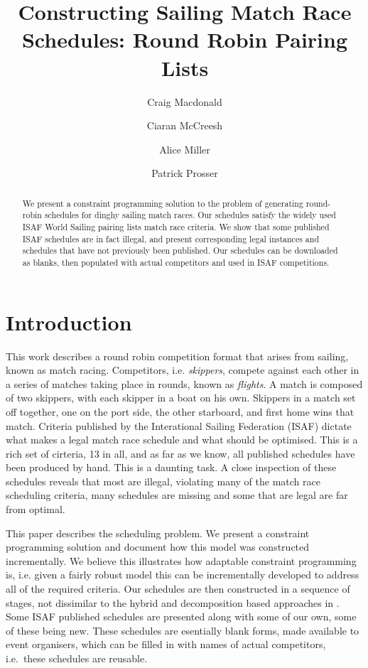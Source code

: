 \documentclass{llncs}
\begin{document}
\title{Constructing Sailing Match Race Schedules: Round Robin Pairing Lists}
\author{Craig Macdonald \and Ciaran McCreesh \and Alice Miller \and Patrick Prosser}
\maketitle

\begin{abstract} 
We present a constraint programming solution to the problem of generating round-robin schedules for dinghy sailing match races. Our schedules satisfy the widely used ISAF World Sailing pairing lists match race criteria. We show that some published ISAF schedules are in fact illegal, and present corresponding legal instances and schedules that have not previously been published. Our schedules can be downloaded as blanks, then populated with actual competitors and used in ISAF competitions. 
\end{abstract}

\section{Introduction}
This work describes a round robin competition format that arises from sailing, known as match racing. Competitors, i.e. {\em skippers}, compete against each other in a series of matches taking place in rounds, known as {\em flights}.  A match is composed of two skippers, with each skipper in a boat on his own. Skippers in a match set off together, one on the port side, the other starboard, and first home wins that match. Criteria published by the Interational Sailing Federation (ISAF) dictate what makes a legal match race schedule and what should be optimised. This is a rich set of cirteria, 13 in all, and as far as we know, all published schedules have been produced by hand. This is a daunting task. A close inspection of these schedules reveals that most are illegal, violating many of the match race scheduling criteria, many schedules are missing and some that are legal are far from optimal.

This paper describes the scheduling problem. We present a constraint programming solution and document how this model was constructed incrementally. We believe this illustrates how adaptable constraint programming is, i.e. given a fairly robust model this can be incrementally developed to address all of the required criteria. Our schedules are then constructed in a sequence of stages, not dissimilar to the hybrid and decomposition based approaches in \cite{lombardi2012}. Some ISAF published schedules are presented along with some of our own, some of these being new.  These schedules are esentially blank forms, made available to event organisers, which can be filled in with names of actual competitors, i.e.\ these schedules are reusable.
\end{document}
